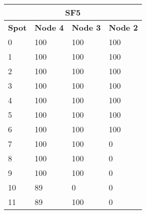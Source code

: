 \begin{tabular}{|l|l|l|l|}
\multicolumn{4}{c}{\textbf{SF5}} \\ \hline 
\textbf{Spot} & \textbf{Node 4} & \textbf{Node 3} & \textbf{Node 2} \\ \hline
0 & 100 & 100 & 100 \\ \hline
1 & 100 & 100 & 100 \\ \hline
2 & 100 & 100 & 100 \\ \hline
3 & 100 & 100 & 100 \\ \hline
4 & 100 & 100 & 100 \\ \hline
5 & 100 & 100 & 100 \\ \hline
6 & 100 & 100 & 100 \\ \hline
7 & 100 & 100 & 0 \\ \hline
8 & 100 & 100 & 0 \\ \hline
9 & 100 & 100 & 0 \\ \hline
10 & 89 & 0 & 0 \\ \hline
11 & 89 & 100 & 0 \\ \hline
\end{tabular}
